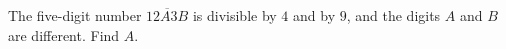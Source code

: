 The five-digit number $\overline{12A3B}$ is divisible by $4$ and by $9$, and the digits $A$ and $B$ are different. Find $A$.
